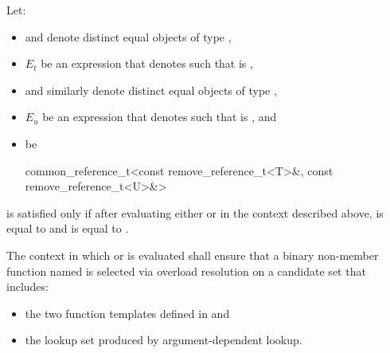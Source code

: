 \begin{removedblock}
\begin{itemdescr}
\pnum
Let:
\begin{itemize}
\item {} and  denote distinct equal objects of type
  ,
\item $E_t$ be an expression that denotes  such that
   is ,
\item {} and  similarly denote distinct equal objects of type
  ,
\item $E_u$ be an expression that denotes  such that
   is , and
\item {} be
  \begin{codeblock}
    common_reference_t<const remove_reference_t<T>&, const remove_reference_t<U>&>
  \end{codeblock}
\end{itemize}
 is satisfied only if after evaluating
either  or  in the context
described above,  is equal to  and  is
equal to .

\pnum
The context in which  or 
is evaluated shall ensure that a binary non-member function named  is
selected via overload resolution on a candidate set that
includes:
\begin{itemize}
\item the two  function templates defined in
   and
\item the lookup set produced by argument-dependent
  lookup.
\end{itemize}
\end{itemdescr}
\end{removedblock}

